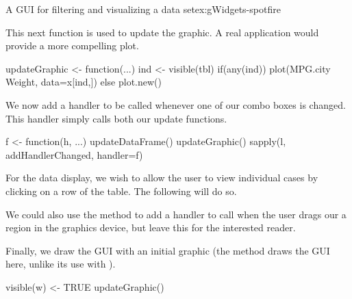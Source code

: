 \begin{example}{A GUI for filtering and visualizing a data set}{ex:gWidgets-spotfire}

This next function is used to update the graphic. A real application
would provide a more compelling plot.
\begin{Schunk}
\begin{Sinput}
 updateGraphic <- function(...) {
   ind <- visible(tbl)
   if(any(ind))
     plot(MPG.city ~ Weight, data=x[ind,])
   else
     plot.new()
 }
\end{Sinput}
\end{Schunk}

We now add a handler to be called whenever one of our combo boxes is
changed. This handler simply calls both our update functions.
\begin{Schunk}
\begin{Sinput}
 f <- function(h, ...) {
   updateDataFrame()
   updateGraphic()
 }
 sapply(l, addHandlerChanged, handler=f)
\end{Sinput}
\end{Schunk}
%
For the data display, we wish to allow the user to view individual cases
by clicking on a row of the table. The following will do so.

\begin{Schunk}
\end{Schunk}
%
We could also use the  method to
add a handler to call when the user drags our a region in the graphics
device, but leave this for the interested reader.


Finally, we draw the GUI with an initial graphic (the
 method draws the GUI here, unlike its use
with ).
\begin{Schunk}
\begin{Sinput}
 visible(w) <- TRUE
 updateGraphic()
\end{Sinput}
\end{Schunk}
\end{example}


